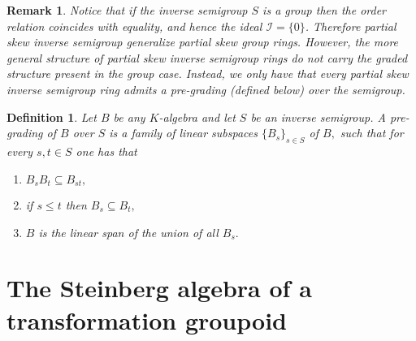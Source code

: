 \documentclass[11pt, a4paper]{amsart}
\theoremstyle{plain}
\newtheorem{prop}[theorem]{Proposition}
\newtheorem{definition}[theorem]{Definition}
\newtheorem{remark}[theorem]{Remark}
\begin{document}




\begin{remark} Notice that if the inverse semigroup $S$ is a group then the order relation coincides with equality, and hence the ideal $\mathcal{I} = \{0\}$. Therefore partial skew inverse semigroup generalize partial skew group rings. However, the more general structure of partial skew inverse semigroup rings do not carry the graded structure present in the group case. %
Instead, we only have that every partial skew inverse semigroup ring admits a pre-grading (defined below) over the semigroup. 
\end{remark}

\begin{definition} 
Let $B$ be any $K$-algebra and let $S$ be an inverse semigroup. A pre-grading of $B$ over $S$ is a family of linear subspaces $\{B_s\}_{s \in S}$ of $B,$ such that for every $s, t \in S$ one has that
\begin{enumerate}
\item $B_sB_t \subseteq B_{st},$
\item if $s \leq  t$  then $B_s \subseteq B_t,$
\item $B$ is the linear span of the union of all $B_s.$
\end{enumerate}
\end{definition}


\section{The Steinberg algebra of a transformation groupoid}
\end{document}
